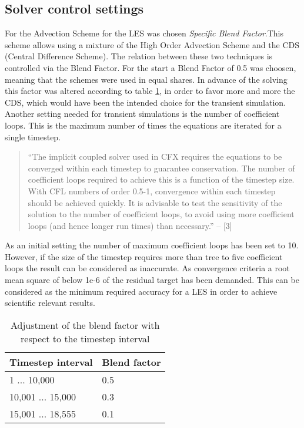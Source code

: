 \subsection{Solver control settings}
For the Advection Scheme for the LES was chosen \emph{Specific Blend Factor}.This scheme allows using a mixture of the High Order Advection Scheme and the CDS (Central Difference Scheme). The relation between these two techniques is controlled via the Blend Factor. For the start a Blend Factor of 0.5 was choosen, meaning that the schemes were used in equal shares. In advance of the solving this factor was altered according to table \ref{tab:blend_factor}, in order to favor more and more the CDS, which would have been the intended choice for the transient simulation. 
Another setting needed for transient simulations is the number of coefficient loops. This is the maximum number of times the equations are iterated for a single timestep.
\begin{quote}
``The implicit coupled solver used in CFX requires the equations to be converged within each timestep to guarantee conservation. The number of coefficient loops required to achieve this is a function of the timestep size. With CFL numbers of order 0.5-1, convergence within each timestep should be achieved quickly. It is advisable to test the sensitivity of the solution to the number of coefficient loops, to avoid using more coefficient loops (and hence longer run times) than necessary.'' – [3]
\end{quote}
As an initial setting the number of maximum coefficient loops has been set to 10. However, if the size of the timestep requires more than tree to five coefficient loops the result can be considered as inaccurate.
As convergence criteria a root mean square of below 1e-6 of the residual target has been demanded. This can be considered as the minimum required accuracy for a LES in order to achieve scientific relevant results.
\begin{table}[ht]
\centering
\caption{Adjustment of the blend factor with respect to the timestep interval}
\label{tab:blend_factor}
\begin{tabular}{ll}
Timestep interval&Blend factor\\
\hline
1 ... 10,000&0.5\\
10,001 ... 15,000&0.3\\
15,001 ... 18,555&0.1\\
\end{tabular}
\end{table}

